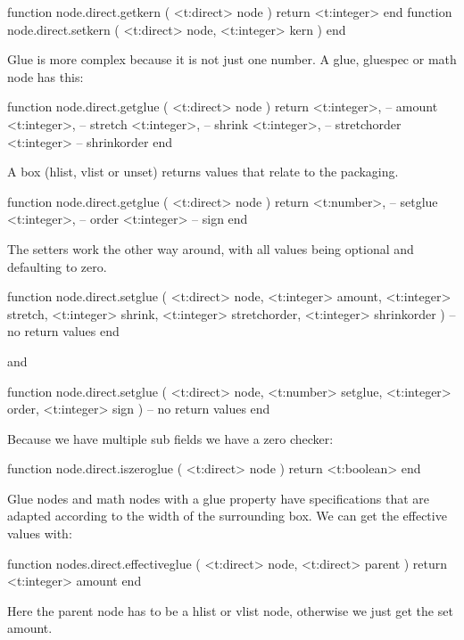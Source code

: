 \starttyping[option=LUA]
function node.direct.getkern ( <t:direct> node ) return <t:integer> end
function node.direct.setkern ( <t:direct> node, <t:integer> kern ) end
\stoptyping

Glue is more complex because it is not just one number. A glue, gluespec or math
node has this:

\starttyping[option=LUA]
function node.direct.getglue ( <t:direct> node )
    return
        <t:integer>, -- amount
        <t:integer>, -- stretch
        <t:integer>, -- shrink
        <t:integer>, -- stretchorder
        <t:integer>  -- shrinkorder
end
\stoptyping

A box (hlist, vlist or unset) returns values that relate to the packaging.

\starttyping[option=LUA]
function node.direct.getglue ( <t:direct> node )
    return
        <t:number>,  -- setglue
        <t:integer>, -- order
        <t:integer>  -- sign
end
\stoptyping

The setters work the other way around, with all values being optional and
defaulting to zero.

\starttyping[option=LUA]
function node.direct.setglue (
    <t:direct>  node,
    <t:integer> amount,
    <t:integer> stretch,
    <t:integer> shrink,
    <t:integer> stretchorder,
    <t:integer> shrinkorder
)
   -- no return values
end
\stoptyping

and

\starttyping[option=LUA]
function node.direct.setglue (
    <t:direct>  node,
    <t:number>  setglue,
    <t:integer> order,
    <t:integer> sign
)
   -- no return values
end
\stoptyping

Because we have multiple sub fields we have a zero checker:

\starttyping[option=LUA]
function node.direct.iszeroglue ( <t:direct> node ) return <t:boolean> end
\stoptyping

Glue nodes and math nodes with a glue property have specifications that
are adapted according to the width of the surrounding box. We can get the
effective values with:

\starttyping[option=LUA]
function nodes.direct.effectiveglue (
    <t:direct> node,
    <t:direct> parent
)
    return <t:integer> amount
end
\stoptyping

Here the parent node has to be a hlist or vlist node, otherwise we just get the
set amount.

\stopsubsection

\startsubsection[title=Packaging and dimensions]

